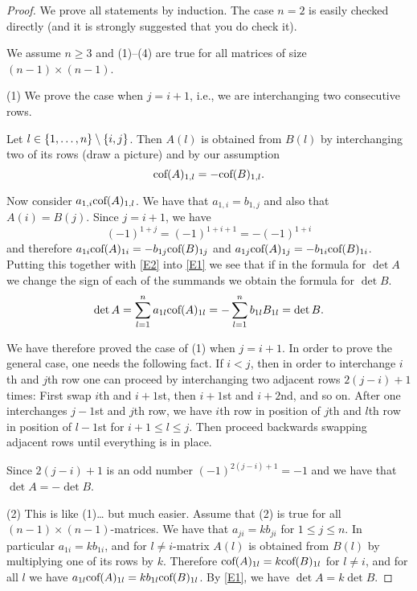 \begin{proof} 
We prove all statements by induction. The case $n=2$ is easily checked directly (and it is strongly suggested that you do check it). 

We assume $n\geq 3$ and  (1)--(4) are true for all matrices of size $(n-1)\times (n-1)$. 

(1) 
We prove the case when $j=i+1$, i.e., we are interchanging two consecutive rows. 

Let $l\in \left\{1, \dots, n\right\}\setminus \left\{i,j\right\}$. 
Then $A(l)$ is obtained from $B(l)$ by interchanging two of its rows (draw a picture) and 
by our assumption 
\begin{equation} 
\label{E2} 
\mbox{\rm cof}(A)_{1,l}=-\mbox{\rm cof}(B)_{1,l}. 
\end{equation} 

Now consider $a_{1,i} \mbox{\rm cof}(A)_{1,l}$. We have that $a_{1,i}=b_{1,j}$ 
and also that $A(i)=B(j)$. Since $j=i+1$, we have 
\[
(-1)^{1+j}=(-1)^{1+i+1}=-(-1)^{1+i} 
\]
and therefore $a_{1i}\mbox{\rm cof}(A)_{1i}=-b_{1j} \mbox{\rm cof}(B)_{1j}$ and $a_{1j}\mbox{\rm cof}(A)_{1j}=-b_{1i} \mbox{\rm cof}(B)_{1i}$. 
Putting this together with \eqref{E2} into \eqref{E1} we see that if in the formula
for $\det A$ we change the sign of each of the summands we obtain the formula for $\det B$. 
\[
\det A=\sum_{l=1}^n a_{1l}\mbox{\rm cof}(A)_{1l}
=-\sum_{l=1}^n b_{1l} B_{1l}
=\det B. 
\]

We have therefore proved the case of (1) when $j=i+1$. In order to prove the general case, 
one needs the following fact. If $i<j$, then in order to interchange $i$th and $j$th row one 
can proceed by interchanging two adjacent rows $2(j-i)+1$ times: 
First swap $i$th and $i+1$st, then $i+1$st and $i+2$nd, and so on. 
After one interchanges $j-1$st and $j$th row, we have $i$th row in position of $j$th
and $l$th row in position of $l-1$st for $i+1\leq l\leq j$. Then proceed backwards 
swapping adjacent 
rows until everything is in place. 

Since $2(j-i)+1$ is an odd number $(-1)^{2(j-i)+1}=-1$ and 
we have that $\det A=-\det B$. 

(2) This is like (1)\dots{} but much easier. 
Assume that (2) is true for all $(n-1)\times (n-1)$-matrices. 
We have that $a_{ji}=k b_{ji}$ for $1\leq j\leq n$. 
In particular $a_{1i}=kb_{1i}$, and for $l\neq i$-matrix 
$A(l)$ is obtained from $B(l)$ by multiplying one of its rows by $k$. 
Therefore $\mbox{\rm cof}(A)_{1l}=k\mbox{\rm cof}(B)_{1l}$ for $l\neq i$, 
and for all $l$ we have $a_{1l} \mbox{\rm cof}(A)_{1l}=k b_{1l}\mbox{\rm cof}(B)_{1l}$. 
By \eqref{E1}, we have $\det A=k\det B$. 


\end{proof}
